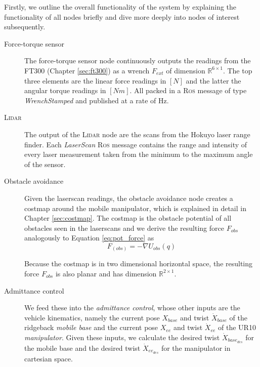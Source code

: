 Firstly, we outline the overall functionality of the system by explaining the functionality of all nodes briefly and dive more deeply into nodes of interest subsequently.

\begin{description}
  \item[Force-torque sensor] The force-torque sensor node continuously outputs the readings from the FT300 (Chapter \ref{sec:ft300}) as a wrench $F_{ext}$ of dimension $\mathbb{R}^{6 \times 1}$. The top three elements are the linear force readings in $[N]$ and the latter the angular torque readings in $[Nm]$. All packed in a \textsc{Ros} message of type \emph{WrenchStamped} \citep{rosWrench} and published at a rate of \unit[100]{Hz}. 
  \item[\textsc{Lidar}] The output of the \textsc{Lidar} node are the scans from the Hokuyo laser range finder. Each \emph{LaserScan} \textsc{Ros} message \citep{rosLaserscan} contains the range and intensity of every laser measurement taken from the minimum to the maximum angle of the sensor.
  \item[Obstacle avoidance] Given the laserscan readings, the obstacle avoidance node creates a costmap \citep{rosCostmap} around the mobile manipulator, which is explained in detail in Chapter \ref{sec:costmap}. The costmap is the obstacle potential of all obstacles seen in the laserscans and we derive the resulting force $F_{obs}$ analogously to Equation \ref{eq:pot_force} as
  \begin{equation}
  F_(obs) = - \nabla U_{obs}(q)
  \end{equation}
  
  Because the costmap is in two dimensional horizontal space, the resulting force $F_{obs}$ is also planar and has dimension $\mathbb{R}^{2 \times 1}$. 
  
  \item[Admittance control] We feed these into the \emph{admittance control}, whose other inputs are the vehicle kinematics, namely the current pose $X_{base}$ \citep{rosPose} and twist $\dot{X}_{base}$ \citep{rosTwist} of the ridgeback \emph{mobile base} and the current pose $X_{ee}$ and twist $\dot{X}_{ee}$ of the UR10 \emph{manipulator}. Given these inputs, we calculate the desired twist $\dot{X}_{base_{des}}$ for the mobile base and the desired twist $\dot{X}_{ee_{des}}$ for the manipulator in cartesian space.
  

\end{description}
